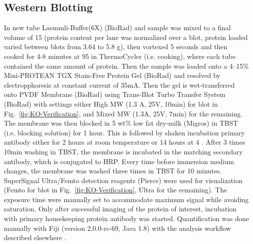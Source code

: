 \subsection{Western Blotting}
In new tube Laemmli-Buffer(6X) (BioRad) and sample was mixed to a final volume of 15\mul{} (protein content per lane was normalized over a blot, protein loaded varied between blots from 3.64 to 5.8 \textmu{}g), then  vortexed 5 seconds and then cooked for 4-8 minutes at 95 \degC in ThermoCycler (i.e. cooking), where each tube contained the same amount of protein. Then the sample was loaded onto a 4–15\% Mini-PROTEAN TGX Stain-Free Protein Gel (BioRad) and resolved by electropphoresis at constant current of 35mA. Then the gel is wet-transferred onto PVDF Membrane (BioRad) using Trans-Blot Turbo Transfer System (BioRad) with settings either High MW (1.3 A, 25V, 10min) for blot in Fig.~\vref{fig:KO-Verification}, and Mixed MW (1.3A, 25V, 7min) for the remaining. The membrane was then blocked in 5 wt\% low fat dry-milk (Migros) in TBST (i.e. blocking solution) for 1 hour. This is followed by shaken incubation primary antibody either for 2 hours at room temperature or 14 hours at 4 \degC{}. After 3 times 10min washing in TBST, the membrane is incubated in the matching secondary antibody, which is conjugated to HRP. Every time before immersion medium changes, the membrane was washed three times in TBST for 10 minutes. SuperSignal Ultra/Femto detection reagents (Pierce) were used for visualization (Femto for blot in Fig.~\vref{fig:KO-Verification}, Ultra for the remaining). The exposure time were manually set to accommodate maximum signal while avoiding saturation. Only after successful imaging of the protein of interest, incubation with primary housekeeping protein antibody was started. Quantification was done manually with Fiji (version 2.0.0-rc-69, Java 1.8) with the analysis workflow described elsewhere \cite{Miller2010}.



